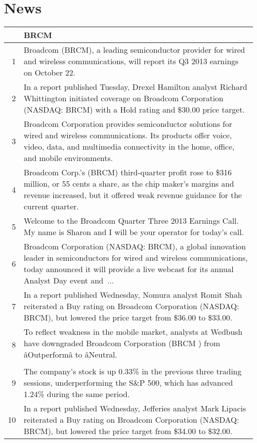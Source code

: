 \documentclass{tufte-handout}\usepackage[]{graphicx}\usepackage[]{color}
\begin{document}
% 
% 

\newpage
\section{News}


\begin{tabularx}{\textwidth}{rX}
  \hline
 & BRCM \\ 
  \hline
1 &  Broadcom (BRCM), a leading semiconductor provider for wired and wireless communications, will report its Q3 2013 earnings on October 22.  \\ 
  2 &  In a report published Tuesday, Drexel Hamilton analyst Richard Whittington initiated coverage on Broadcom Corporation (NASDAQ: BRCM) with a Hold rating and \$30.00 price target.  \\ 
  3 &  Broadcom Corporation provides semiconductor solutions for wired and wireless communications. Its products offer voice, video, data, and multimedia connectivity in the home, office, and mobile environments.  \\ 
  4 &  Broadcom Corp.'s (BRCM) third-quarter profit rose to \$316 million, or 55 cents a share, as the chip maker's margins and revenue increased, but it offered weak revenue guidance for the current quarter.  \\ 
  5 &  Welcome to the Broadcom Quarter Three 2013 Earnings Call. My name is Sharon and I will be your operator for today's call.  \\ 
  6 &  Broadcom Corporation (NASDAQ: BRCM), a global innovation leader in semiconductors for wired and wireless communications, today announced it will provide a live webcast for its annual Analyst Day event and ...  \\ 
  7 &  In a report published Wednesday, Nomura analyst Romit Shah reiterated a Buy rating on Broadcom Corporation (NASDAQ: BRCM), but lowered the price target from \$36.00 to \$33.00.  \\ 
  8 &  To reflect weakness in the mobile market, analysts at Wedbush have downgraded Broadcom Corporation (BRCM ) from âOutperformâ to âNeutral.  \\ 
  9 &  The company's stock is up 0.33\% in the previous three trading sessions, underperforming the S\&P 500, which has advanced 1.24\% during the same period.  \\ 
  10 &  In a report published Wednesday, Jefferies analyst Mark Lipacis reiterated a Buy rating on Broadcom Corporation (NASDAQ: BRCM), but lowered the price target from \$34.00 to \$32.00.  \\ 
   \hline
\end{tabularx}
\end{document}
